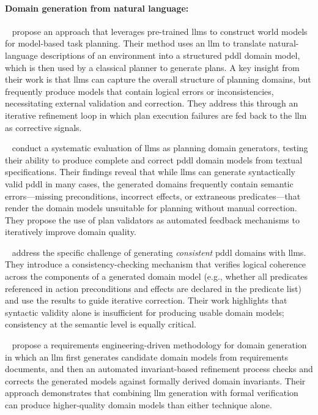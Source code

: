 \paragraph{Domain generation from natural language:}
\citeauthor{Guan2023}~\cite{Guan2023} propose an approach that leverages pre-trained \glspl{llm} to construct world models for model-based task planning.
Their method uses an \gls{llm} to translate natural-language descriptions of an environment into a structured \gls{pddl} domain model, which is then used by a classical planner to generate plans.
A key insight from their work is that \glspl{llm} can capture the overall structure of planning domains, but frequently produce models that contain logical errors or inconsistencies, necessitating external validation and correction.
They address this through an iterative refinement loop in which plan execution failures are fed back to the \gls{llm} as corrective signals.

\citeauthor{Oswald2024}~\cite{Oswald2024} conduct a systematic evaluation of \glspl{llm} as planning domain generators, testing their ability to produce complete and correct \gls{pddl} domain models from textual specifications.
Their findings reveal that while \glspl{llm} can generate syntactically valid \gls{pddl} in many cases, the generated domains frequently contain semantic errors---missing preconditions, incorrect effects, or extraneous predicates---that render the domain models unsuitable for planning without manual correction.
They propose the use of plan validators as automated feedback mechanisms to iteratively improve domain quality.

\citeauthor{Smirnov2024}~\cite{Smirnov2024} address the specific challenge of generating \emph{consistent} \gls{pddl} domains with \glspl{llm}.
They introduce a consistency-checking mechanism that verifies logical coherence across the components of a generated domain model (e.g., whether all predicates referenced in action preconditions and effects are declared in the predicate list) and use the results to guide iterative correction.
Their work highlights that syntactic validity alone is insufficient for producing usable domain models; consistency at the semantic level is equally critical.

\citeauthor{Casciani2025}~\cite{Casciani2025} propose a requirements engineering-driven methodology for domain generation in which an \gls{llm} first generates candidate domain models from requirements documents, and then an automated invariant-based refinement process checks and corrects the generated models against formally derived domain invariants.
Their approach demonstrates that combining \gls{llm} generation with formal verification can produce higher-quality domain models than either technique alone.


